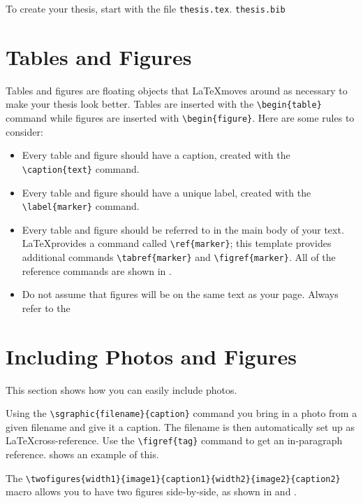 To create your thesis, start with the file \texttt{thesis.tex}. 
\texttt{thesis.bib} 

\section{Tables and Figures}
Tables and figures are floating objects that \LaTeX moves around as
necessary to make your thesis look better. Tables are inserted with
the \verb+\begin{table}+ command while figures are inserted with
\verb+\begin{figure}+. Here are some rules to consider:

\begin{itemize}
\item Every table and figure should have a caption, created with the
  \verb+\caption{text}+ command.
\item Every table and figure should have a unique label, created with
  the \verb+\label{marker}+ command.
\item Every table and figure should be referred to in the main body of
  your text. \LaTeX provides a command called \verb+\ref{marker}+;
  this template provides additional commands \verb+\tabref{marker}+
  and \verb+\figref{marker}+. All of the reference commands are shown
  in .
\item Do not assume that figures will be on the same text as your
  page. Always refer to the 
\end{itemize}

\section{Including Photos and Figures}
This section shows how you can easily include photos. 

Using the \verb+\sgraphic{filename}{caption}+ command you bring in a
photo from a given filename and give it a caption. The filename is
then automatically set up as \LaTeX cross-reference. Use the
\verb+\figref{tag}+ command to get an in-paragraph
reference.  shows an example of this.


The \verb+\twofigures{width1}{image1}{caption1}{width2}{image2}{caption2}+
macro allows you to have two figures side-by-side, as shown in
 and .

